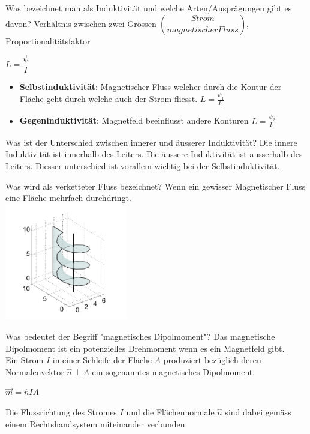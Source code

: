 \begin{karte}{Was bezeichnet man als Induktivität und welche Arten/Ausprägungen gibt es davon?}
	Verhältnis zwischen zwei Grössen $\left(\dfrac{Strom}{magnetischer Fluss}\right)$, Proportionalitätsfaktor\\[5pt]
	\begin{center}
		\begin{large}
			$L = \dfrac{\psi}{I}$\\[5pt]
		\end{large}
	\end{center}
	\begin{itemize}
		\item \textbf{Selbstinduktivität}: Magnetischer Fluss welcher durch die Kontur der Fläche geht durch welche auch der Strom fliesst. $L=\frac{\psi_1}{I_1}$
		\item \textbf{Gegeninduktivität}: Magnetfeld beeinflusst andere Konturen $L=\frac{\psi_2}{I_1}$
	\end{itemize}
\end{karte}

\begin{karte}{Was ist der Unterschied zwischen innerer und äusserer Induktivität?}
	Die innere Induktivität ist innerhalb des Leiters. Die äussere Induktivität ist ausserhalb des Leiters. Diesser unterschied ist vorallem wichtig bei der Selbstinduktivität.
\end{karte}

\begin{karte}{Was wird als verketteter Fluss bezeichnet?}
	Wenn ein gewisser Magnetischer Fluss eine Fläche mehrfach durchdringt.\\
	\center	\includegraphics[width=0.4\textwidth]{pics/MS_Verketteter_Fluss.jpg}
\end{karte}

\begin{karte}{Was bedeutet der Begriff "magnetisches Dipolmoment"?}
	Das magnetische Dipolmoment ist ein potenzielles Drehmoment wenn es ein Magnetfeld gibt.\\
	Ein Strom $I$ in einer Schleife der Fläche $A$ produziert bezüglich deren Normalenvektor $\hat{n} \perp A$ ein sogenanntes magnetisches Dipolmoment.\\
	\begin{center}
		\begin{huge}
			$\vec{m} = \hat{n} I A$
		\end{huge}
	\end{center}
	Die Flussrichtung des Stromes $I$ und die Flächennormale $\hat{n}$ sind dabei gemäss einem Rechtshandsystem miteinander verbunden.
\end{karte}

